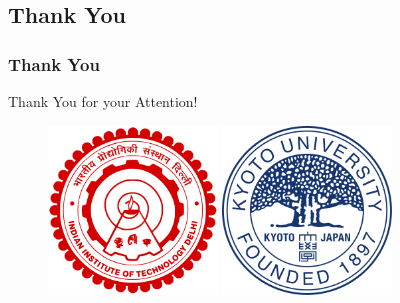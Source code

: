 \documentclass[
	11pt, %
]{beamer}
\begin{document}
\subsection{Thank You}
\begin{frame}
	\frametitle{Thank You}
	\begin{center}
		\Huge Thank You for your Attention!
	\end{center}
	\vfill
\begin{figure}
    \includegraphics[width=0.4\textwidth]{../fig/Indian_Institute_of_Technology_Delhi_Logo.svg.png} %
    \hspace{1mm}
    \includegraphics[width=0.4\textwidth]{../fig/Kyoto_University_emblem.svg.png} %
\end{figure}
\end{frame}


\end{document}
